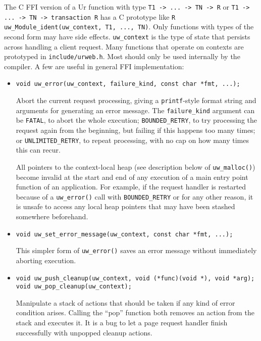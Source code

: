 \documentclass{article}
\begin{document}
The C FFI version of a Ur function with type \texttt{T1 -> ... -> TN -> R} or \texttt{T1 -> ... -> TN -> transaction R} has a C prototype like \texttt{R uw\_Module\_ident(uw\_context, T1, ..., TN)}.  Only functions with types of the second form may have side effects.  \texttt{uw\_context} is the type of state that persists across handling a client request.  Many functions that operate on contexts are prototyped in \texttt{include/urweb.h}.  Most should only be used internally by the compiler.  A few are useful in general FFI implementation:
\begin{itemize}
  \item \begin{verbatim}
void uw_error(uw_context, failure_kind, const char *fmt, ...);
  \end{verbatim}
  Abort the current request processing, giving a \texttt{printf}-style format string and arguments for generating an error message.  The \texttt{failure\_kind} argument can be \texttt{FATAL}, to abort the whole execution; \texttt{BOUNDED\_RETRY}, to try processing the request again from the beginning, but failing if this happens too many times; or \texttt{UNLIMITED\_RETRY}, to repeat processing, with no cap on how many times this can recur.

  All pointers to the context-local heap (see description below of \texttt{uw\_malloc()}) become invalid at the start and end of any execution of a main entry point function of an application.  For example, if the request handler is restarted because of a \texttt{uw\_error()} call with \texttt{BOUNDED\_RETRY} or for any other reason, it is unsafe to access any local heap pointers that may have been stashed somewhere beforehand.

  \item \begin{verbatim}
void uw_set_error_message(uw_context, const char *fmt, ...);
  \end{verbatim}
  This simpler form of \texttt{uw\_error()} saves an error message without immediately aborting execution.

  \item \begin{verbatim}
void uw_push_cleanup(uw_context, void (*func)(void *), void *arg);
void uw_pop_cleanup(uw_context);
  \end{verbatim}
  Manipulate a stack of actions that should be taken if any kind of error condition arises.  Calling the ``pop'' function both removes an action from the stack and executes it.  It is a bug to let a page request handler finish successfully with unpopped cleanup actions.


\end{itemize}
\end{document}
